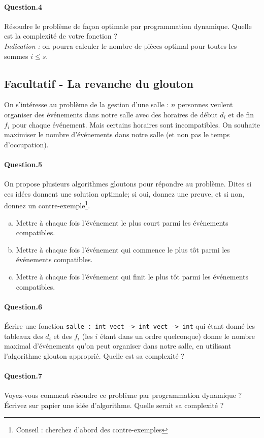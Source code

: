 \documentclass[10pt,a4paper]{article}
\begin{document}
\paragraph{Question.4} Résoudre le problème de façon optimale par programmation
dynamique. Quelle est la complexité de votre fonction ?\\
\textit{Indication :} on pourra calculer le nombre de pièces optimal pour toutes
les sommes $i\leq s$.

\subsection{Facultatif - La revanche du glouton}
On s'intéresse au problème de la gestion d'une salle : $n$ personnes
veulent organiser des événements dans notre salle avec des horaires de début 
$d_i$ et de fin $f_i$ pour chaque événement. Mais certains horaires sont
incompatibles. On souhaite maximiser le nombre d'événements dans notre salle (et
non pas le temps d'occupation).

\paragraph{Question.5} On propose plusieurs algorithmes gloutons pour répondre 
au problème. Dites si ces idées donnent une solution optimale; si oui, donnez 
une preuve, et si non, donnez un contre-exemple\footnote{Conseil : cherchez
d'abord des contre-exemples}.
\begin{enumerate}[a)]
\item Mettre à chaque fois l'événement le plus court parmi les événements 
compatibles.
\item Mettre à chaque fois l'événement qui commence le plus tôt parmi les 
événements compatibles.
\item Mettre à chaque fois l'événement qui finit le plus tôt parmi les 
événements compatibles.
\end{enumerate}

\paragraph{Question.6} Écrire une fonction \texttt{salle : int vect -> int vect -> int}
qui étant donné les tableaux des $d_i$ et des $f_i$ (les $i$ étant dans un ordre
quelconque) donne le nombre maximal d'événements qu'on peut organiser dans notre
salle, en utilisant l'algorithme glouton approprié. Quelle est sa complexité ?

\paragraph{Question.7} Voyez-vous comment résoudre ce problème par programmation
dynamique ? Écrivez sur papier une idée d'algorithme. Quelle serait sa 
complexité ?
\end{document}
